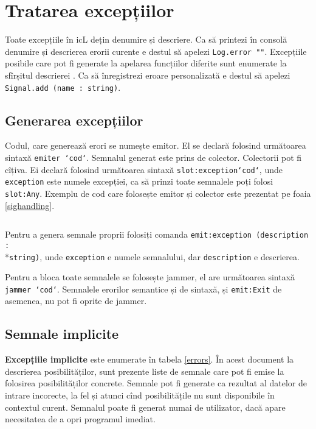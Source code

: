\section{Tratarea excepțiilor}

Toate excepțiile în icL dețin denumire și descriere. Ca să printezi în consolă denumire și descrierea erorii curente e destul să apelezi \texttt{Log.error ""}. Excepțiile posibile care pot fi generate la apelarea funcțiilor diferite sunt enumerate la sfîrșitul descrierei . Ca să înregistrezi eroare personalizată e destul să apelezi \texttt{Signal.add (name : string)}.

\subsection{Generarea excepțiilor}

Codul, care generează erori se numește emitor. El se declară folosind următoarea sintaxă \texttt{emiter {`cod`}}. Semnalul generat este prins de colector. Colectorii pot fi cîțiva. Ei declară folosind următoarea sintaxă \texttt{slot:exception{`cod`}},
unde \texttt{exception} este numele excepției, ca să prinzi toate semnalele poți folosi \texttt{slot:Any}. Exemplu de cod care folosește emitor și colector este prezentat pe foaia \ref{sighandling}.

\begin{sourcecode}
    \label{sighandling}
    \inputminted[linenos]{icl}{../sources/sighandling.icL}
\end{sourcecode}

Pentru a genera semnale proprii folosiți comanda \texttt{emit:exception (description :}\\*\texttt{string)}, unde \texttt{exception} e numele semnalului, dar \texttt{description} e descrierea.

Pentru a bloca toate semnalele se folosește jammer, el are următoarea sintaxă \texttt{jammer {`cod`}}. Semnalele erorilor semantice și de sintaxă, și \texttt{emit:Exit} de asemenea, nu pot fi oprite de jammer.

\subsection{Semnale implicite}

{\bf Excepțiile implicite} este enumerate în tabela \ref{errors}. În acest document la descrierea posibilităților, sunt prezente liste de semnale care pot fi emise la folosirea posibilităților concrete. Semnale pot fi generate ca rezultat al datelor de intrare incorecte, la fel și atunci cînd posibilitățile nu sunt disponibile în contextul curent. Semnalul  poate fi generat numai de utilizator, dacă apare necesitatea de a opri programul imediat.

